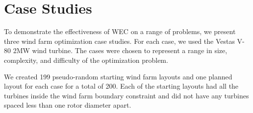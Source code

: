 \documentclass{jpconf}
\begin{document}
%
%

\section{Case Studies}\label{sec:casestudies}
To demonstrate the effectiveness of WEC on a range of problems, we present three wind farm optimization case studies. For each case, we used the Vestas V-80 2MW wind turbine. The cases were chosen to represent a range in size, complexity, and difficulty of the optimization problem.

We created 199 pseudo-random starting wind farm layouts and one planned layout for each case for a total of 200. Each of the starting layouts had all the turbines inside the wind farm boundary constraint and did not have any turbines spaced less than one rotor diameter apart.
\end{document}

